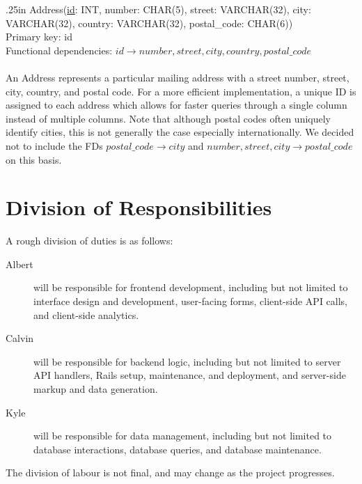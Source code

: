 \documentclass[letterpaper]{report}
\begin{document}
\hangindent .25in
{\sffamily Address(\underline{id}: INT, number: CHAR(5), street: VARCHAR(32), city: VARCHAR(32), country: VARCHAR(32), postal\_code: CHAR(6))}\\
Primary key: {\sffamily id} \\
Functional dependencies: $id \to number, street, city, country, postal\_code$ \\\\
An {\sffamily Address} represents a particular mailing address with a street number, street, city, country, and postal code. For a more efficient implementation, a unique ID is assigned to each address which allows for faster queries through a single column instead of multiple columns. Note that although postal codes often uniquely identify cities, this is not generally the case especially internationally. We decided not to include the FDs $postal\_code \to city$ and $number, street, city \to postal\_code$ on this basis.

\section*{Division of Responsibilities}
A rough division of duties is as follows:
\begin{description}
	\item[Albert] will be responsible for frontend development, including but not limited to interface design and development, user-facing forms, client-side API calls, and client-side analytics.
	\item[Calvin] will be responsible for backend logic, including but not limited to server API handlers, Rails setup, maintenance, and deployment, and server-side markup and data generation.
	\item[Kyle] will be responsible for data management, including but not limited to database interactions, database queries, and database maintenance.
\end{description}

The division of labour is not final, and may change as the project progresses.
\end{document}
